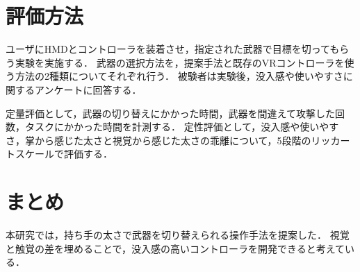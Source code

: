 \documentclass[uplatex]{jsarticle}
\begin{document}
\section{評価方法}

ユーザにHMDとコントローラを装着させ，指定された武器で目標を切ってもらう実験を実施する．
武器の選択方法を，提案手法と既存のVRコントローラを使う方法の2種類についてそれぞれ行う．
被験者は実験後，没入感や使いやすさに関するアンケートに回答する．

定量評価として，武器の切り替えにかかった時間，武器を間違えて攻撃した回数，タスクにかかった時間を計測する．
定性評価として，没入感や使いやすさ，掌から感じた太さと視覚から感じた太さの乖離について，5段階のリッカートスケールで評価する．

\section{まとめ}

本研究では，持ち手の太さで武器を切り替えられる操作手法を提案した．
視覚と触覚の差を埋めることで，没入感の高いコントローラを開発できると考えている．





\end{document}
